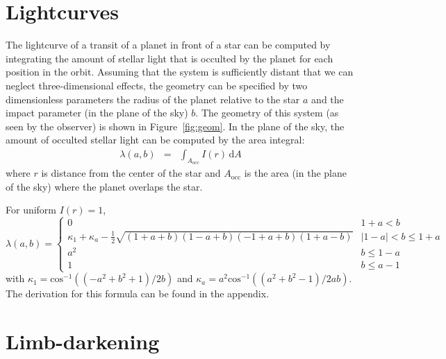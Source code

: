 \documentclass[12pt,preprint]{aastex}
\newcommand{\Fig}[1]{Figure~\ref{fig:#1}}
\newcommand{\fig}[1]{\Fig{#1}}
\newcommand{\eqlabel}[1]{\label{eq:#1}}
\newcommand{\dd}{\mathrm{d}}
\begin{document}
\section{Lightcurves}

The lightcurve of a transit of a planet in front of a star can be computed by
integrating the amount of stellar light that is occulted by the planet for
each position in the orbit. Assuming that the system is sufficiently distant
that we can neglect three-dimensional effects, the geometry can be specified
by two dimensionless parameters the radius of the planet relative to the
star $a$ and the impact parameter (in the plane of the sky) $b$. The geometry
of this system (as seen by the observer) is shown in \fig{geom}. In the plane
of the sky, the amount of occulted stellar light can be computed by the area
integral:
\begin{eqnarray}\eqlabel{general-occ}
    \lambda (a, b) & = & \int_{A_\mathrm{occ}} I(r) \, \dd A
\end{eqnarray}
where $r$ is distance from the center of the star and $A_\mathrm{occ}$ is the
area (in the plane of the sky) where the planet overlaps the star.

For uniform $I(r) = 1$, 
\[
\lambda(a,b) = \left\{ \begin{array}{ll} 0 & 1+a<b \\ \kappa_1 + \kappa_a - \frac{1}{2} \sqrt{(1+a+b)(1-a+b)(-1+a+b)(1+a-b)}    & |1-a| < b \leq 1+a \\ a^2 & b \leq 1-a \\ 1 & b \leq a-1 \end{array} \right.
\]
with $\kappa_1 = \mathrm{cos}^{-1}((-a^2+b^2+1)/2b)$ and $\kappa_a = a^2 \mathrm{cos}^{-1}((a^2+b^2-1)/2ab)$. The derivation for this formula can be found in the appendix.
\section{Limb-darkening}
\end{document}

